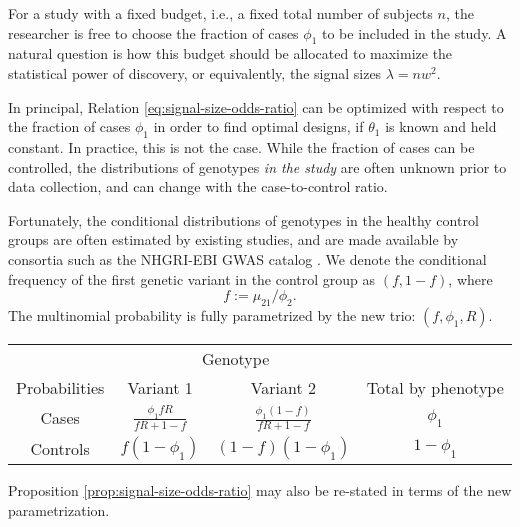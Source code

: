 For a study with a fixed budget, i.e., a fixed total number of subjects $n$, the researcher is free to choose the fraction of cases $\phi_1$ to be included in the study.
A natural question is how this budget should be allocated to maximize the statistical power of discovery, or equivalently, the signal sizes $\lambda=nw^2$.

In principal, Relation \eqref{eq:signal-size-odds-ratio} can be optimized with respect to the fraction of cases $\phi_1$ in order to find optimal designs, if $\theta_1$ is known and held constant.
In practice, this is not the case.
While the fraction of cases can be controlled, the distributions of genotypes \emph{in the study} are often unknown prior to data collection, and can change with the case-to-control ratio.

Fortunately, the conditional distributions of genotypes in the healthy control groups are often estimated by existing studies, and are made available by consortia such as the NHGRI-EBI GWAS catalog \cite{macarthur2016new}.
We denote the conditional frequency of the first genetic variant in the control group as $(f, 1-f)$, where
\begin{equation} \label{eq:RAF}
    f := \mu_{21} / \phi_2.
\end{equation}
The multinomial probability is fully parametrized by the new trio: $(f, \phi_1, R)$.
\begin{center}
    \begin{tabular}{cccc}
    \hline
    & \multicolumn{2}{c}{Genotype} \\
    \cline{2-3}
    Probabilities & Variant 1 & Variant 2 & Total by phenotype \\
    \hline
    Cases & $\frac{\phi_1fR}{fR+1-f}$ & $\frac{\phi_1(1-f)}{fR+1-f}$ & $\phi_1$ \\
    Controls & $f(1-\phi_1)$ & $(1-f)(1-\phi_1)$ & $1-\phi_1$ \\
    \hline
    \end{tabular}
\end{center}
Proposition \ref{prop:signal-size-odds-ratio} may also be re-stated in terms of the new parametrization.


